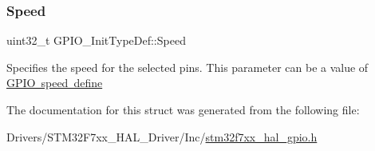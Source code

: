 \subsubsection{\texorpdfstring{Speed}{Speed}}
{\footnotesize\ttfamily uint32\+\_\+t G\+P\+I\+O\+\_\+\+Init\+Type\+Def\+::\+Speed}

Specifies the speed for the selected pins. This parameter can be a value of \mbox{\hyperlink{group___g_p_i_o__speed__define}{G\+P\+IO speed define}} 

The documentation for this struct was generated from the following file\+:\begin{DoxyCompactItemize}
\item 
Drivers/\+S\+T\+M32\+F7xx\+\_\+\+H\+A\+L\+\_\+\+Driver/\+Inc/\mbox{\hyperlink{stm32f7xx__hal__gpio_8h}{stm32f7xx\+\_\+hal\+\_\+gpio.\+h}}\end{DoxyCompactItemize}
